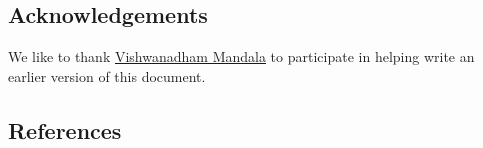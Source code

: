\hypertarget{acknowledgements}{%
\subsection{Acknowledgements}\label{acknowledgements}}

We like to thank
\href{https://github.com/cybertraining-dsc/fa20-523-325/}{Vishwanadham
Mandala} to participate in helping write an earlier version of this
document.

\hypertarget{references}{%
\subsection{References}\label{references}}
